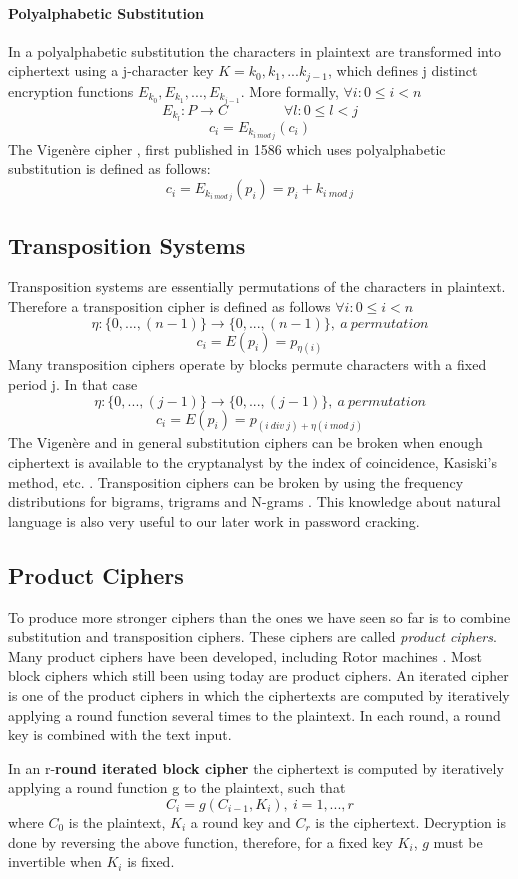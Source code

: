 \paragraph{Polyalphabetic Substitution}
In a polyalphabetic substitution the characters in plaintext are transformed into ciphertext using a j-character key $K = k_{0}, k_{1}, ... k_{j-1}$, which defines j distinct encryption functions $E_{k_{0}}, E_{k_{1}}, ... , E_{k_{j-1}}$. More formally, $\forall i : 0 \leq i < n$  $$ E_{k_{l}} : P \rightarrow C   \qquad  \qquad   \forall l : 0 \leq l < j$$
$$ c_{i} = E_{k_{i\ mod\ j}}(c_{i})$$
The Vigen\`{e}re cipher \cite{robling1982cryptography}, first published in 1586 which uses polyalphabetic substitution is defined as follows:$$ c_{i} = E_{k_{i\ mod \ j}}(p_{i}) = p_{i} + k_{i\ mod \ j} $$
\subsection{Transposition Systems}
Transposition systems are essentially permutations of the characters in plaintext. Therefore a transposition cipher is defined as follows $\forall i : 0 \leq i < n$ 
$$ \eta : \{0,...,(n-1)\} \rightarrow \{0,...,(n-1)\},\ a\ permutation$$
$$c_{i} = E(p_{i}) = p_{\eta (i)}$$
Many transposition ciphers operate by blocks permute characters with a fixed period j. In that case
$$ \eta : \{0,...,(j-1)\} \rightarrow \{0,...,(j-1)\},\ a\ permutation$$
$$c_{i} = E(p_{i}) = p_{(i\ div\ j)+\eta (i\ mod\ j)}$$
The Vigen\`{e}re and in general substitution ciphers can be broken when enough ciphertext is available to the cryptanalyst by the index of coincidence, Kasiski's method, etc. \cite{davies1989security,robling1982cryptography,kahn1996codebreakers}. Transposition ciphers can be broken by using the frequency distributions for bigrams, trigrams and N-grams \cite{davies1989security, robling1982cryptography, kahn1996codebreakers}. This knowledge about natural language is also very useful to our later work in password cracking.
\subsection{Product Ciphers}
To produce more stronger ciphers than the ones we have seen so far is to combine substitution and transposition ciphers. These ciphers are called \textit{product ciphers}. Many product ciphers have been developed, including Rotor machines \cite{davies1989security}. Most block ciphers which still been using today are product ciphers. An iterated cipher is one of the product ciphers in which the ciphertexts are computed by iteratively applying a round function several times to the plaintext. In each round, a round key is combined with the text input.
\begin{mydef}
	In an r-\textbf{round iterated block cipher} the ciphertext is computed by iteratively applying a round function g to the plaintext, such that$$C_{i} = g(C_{i-1},K_{i}),\ i = 1,...,r$$ where $C_{0}$ is the plaintext, $K_{i}$ a round key and $C_{r}$ is the ciphertext. Decryption is done by reversing the above function, therefore, for a fixed key $K_{i}$, $g$ must be invertible when $K_{i}$ is fixed.
\end{mydef}
